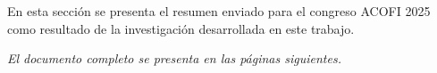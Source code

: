 
En esta sección se presenta el resumen enviado para el congreso ACOFI 2025 como
resultado de la investigación desarrollada en este trabajo.

\vfill

\textit{El documento completo se presenta en las páginas siguientes.}

